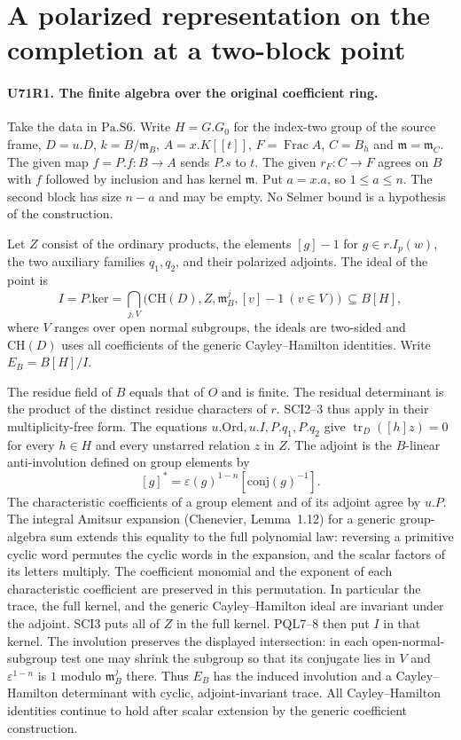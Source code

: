 \section{A polarized representation on the completion at a two-block point}

\paragraph{U71R1. The finite algebra over the original coefficient ring.}
Take the data in $\mathrm{Pa.S6}$. Write $H=G.G_0$ for the
index-two group of the source frame, $D=u.D$, $k=B/\mathfrak m_B$,
$A=x.K[[t]]$, $F=\operatorname{Frac}A$,
$C=B_h$ and $\mathfrak m=\mathfrak m_C$. The given map
$f=P.f:B\longrightarrow A$ sends $P.s$ to $t$.
The given $r_F:C\longrightarrow F$ agrees on $B$ with $f$
followed by inclusion and has kernel $\mathfrak m$.
Put $a=x.a$, so $1\leq a\leq n$.
The second block has size $n-a$ and may be empty.
No Selmer bound is a hypothesis of the construction.

Let $Z$ consist of the ordinary products, the elements $[g]-1$
for $g\in r.I_p(w)$, the two auxiliary families $q_1,q_2$,
and their polarized adjoints. The ideal of the point is
\[
 I=P.\mathrm{ker}=
 \bigcap_{j,V}
 \bigl(\mathrm{CH}(D),Z,\mathfrak m_B^j,[v]-1\ (v\in V)\bigr)
 \ \subseteq B[H],
\]
where $V$ ranges over open normal subgroups, the ideals are
two-sided and $\mathrm{CH}(D)$ uses all coefficients of the generic
Cayley--Hamilton identities. Write $E_B=B[H]/I$.

The residue field of $B$ equals that of $O$ and is finite.
The residual determinant is the product of the distinct residue
characters of $r$. SCI2--3 thus apply in their multiplicity-free
form. The equations $u.\mathrm{Ord},u.I,P.q_1,P.q_2$ give
$\operatorname{tr}_D([h]z)=0$ for every $h\in H$ and every
unstarred relation $z$ in $Z$. The adjoint is the $B$-linear
anti-involution defined on group elements by
\[
 [g]^*=\varepsilon(g)^{1-n}[\mathrm{conj}(g)^{-1}].
\]
The characteristic coefficients of a group element and of its
adjoint agree by $u.P$. The integral Amitsur expansion (Chenevier, Lemma~1.12) for a
generic group-algebra sum extends this equality to the full
polynomial law: reversing a primitive cyclic word permutes the
cyclic words in the expansion, and the scalar factors of its
letters multiply. The coefficient monomial and the exponent of each
characteristic coefficient are preserved in this permutation.
In particular the trace, the full kernel, and the generic
Cayley--Hamilton ideal are invariant under the adjoint.
SCI3 puts all of $Z$ in the full kernel. PQL7--8 then put $I$
in that kernel. The involution preserves the displayed intersection:
in each open-normal-subgroup test one may shrink the subgroup so that
its conjugate lies in $V$ and $\varepsilon^{1-n}$ is $1$ modulo
$\mathfrak m_B^j$ there. Thus $E_B$ has the induced involution and
a Cayley--Hamilton determinant with cyclic, adjoint-invariant trace.
All Cayley--Hamilton identities continue to hold after scalar
extension by the generic coefficient construction.

